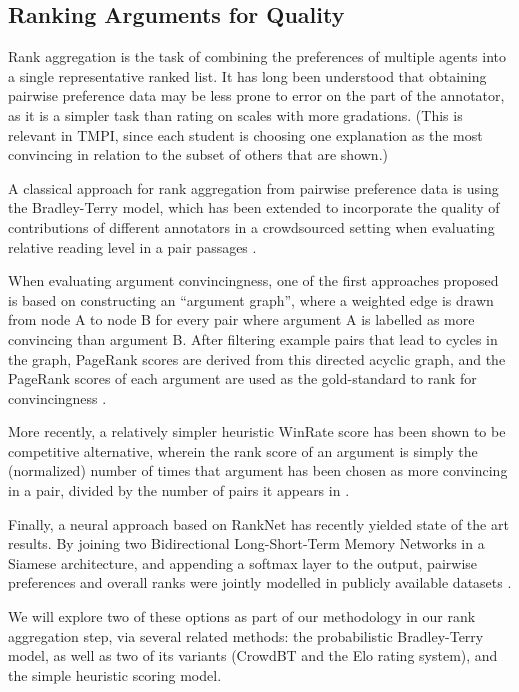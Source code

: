 \documentclass[notitlepage,12pt]{jedm}
\begin{document}
\subsection{Ranking Arguments for Quality}
Rank aggregation is the task of combining the preferences of multiple agents 
into a single representative ranked list.
It has long been understood that obtaining pairwise preference data may be 
less prone to error on the part of the annotator, as it is a simpler task than 
rating on scales with more gradations. 
(This is relevant in TMPI, since each student is choosing one explanation as 
the most convincing in relation to the subset of others that are shown.)

A classical approach for rank aggregation from pairwise preference data is 
using the Bradley-Terry model, which has been extended to incorporate the 
quality of contributions of different annotators in a crowdsourced setting when 
evaluating relative reading level in a pair passages \cite{chen_pairwise_2013}. 

When evaluating argument convincingness, one of the first approaches proposed 
is based on constructing an ``argument graph'', where a weighted edge is drawn 
from node A to node B for every pair where argument A is labelled as more 
convincing than argument B. 
After filtering example pairs that lead to cycles in the graph, PageRank scores 
are derived from this directed acyclic graph, and the PageRank 
scores of each argument are used as the gold-standard to rank for 
convincingness \cite{habernal_which_2016}.

More recently, a relatively simpler heuristic WinRate score has been shown to 
be competitive alternative, wherein the rank score of an argument is simply the 
(normalized) number of times that argument has been chosen as more convincing 
in a pair, divided by the number of pairs it appears in
\cite{potash_ranking_2019}.

Finally, a neural approach based on RankNet has recently yielded state of the 
art results. By joining two Bidirectional Long-Short-Term Memory Networks in a 
Siamese architecture, and appending a softmax layer to the output, pairwise 
preferences and overall ranks were jointly modelled in publicly available 
datasets \cite{gleize_are_2019}.

We will explore two of these options as part of our methodology in our rank 
aggregation step, via several related methods: 
the probabilistic Bradley-Terry model, as well as two of its variants (CrowdBT 
and the Elo rating system), and the simple heuristic scoring model.
\end{document}
